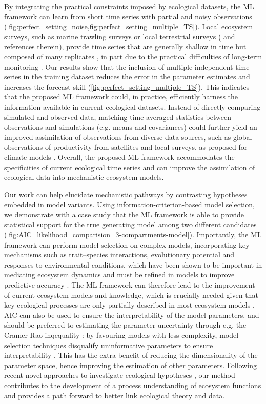 By integrating the practical constraints imposed by ecological datasets, the ML framework can learn from short time series with partial and noisy observations (\cref{fig:perfect_setting_noise,fig:perfect_setting_multiple_TS}). 
% 
Local ecosystem surveys, such as marine trawling surveys or local terrestrial surveys (\citep{Pinsky2013,Dornelas2018,Burrows2019} and references therein), provide time series that are generally shallow in time but composed of many replicates \citep{Hsieh2008,Clark2015}, in part due to the practical difficulties of long-term monitoring \citep{Ye2016}. 
% 
Our results show that the inclusion of multiple independent time series in the training dataset reduces the error in the parameter estimates and increases the forecast skill (\cref{fig:perfect_setting_multiple_TS}). This indicates that the proposed ML framework could, in practice, efficiently harness the information available in current ecological datasets.
% 
Instead of directly comparing simulated and observed data, matching time-averaged statistics between observations and simulations (e.g. means and covariances) could further yield an improved assimilation of observations from diverse data sources, such as global observations of productivity from satellites and local surveys, as proposed for climate models \citep{Schneider2017}.
% 
Overall, the proposed ML framework accommodates the specificities of current ecological time series and can improve the assimilation of ecological data into mechanistic ecosystem models.

Our work can help elucidate mechanistic pathways by contrasting hypotheses embedded in model variants.
%
Using information-criterion-based model selection, we demonstrate with a case study that the ML framework is able to provide statistical support for the true generating model among two different candidates (\cref{fig:AIC_likelihood_comparision_3-compartments-model}).
% 
Importantly, the ML framework can perform model selection on complex models, incorporating key mechanisms such as trait--species interactions, evolutionary potential and responses to environmental conditions, which have been shown to be important in mediating ecosystem dynamics and must be refined in models to improve predictive accuracy \citep{Urban2016}.
% 
The ML framework can therefore lead to the improvement of current ecosystem models and knowledge, which is crucially needed given that key ecological processes are only partially described in most ecosystem models \citep{Schartau2017}.
% 
AIC can also be used to ensure the interpretability of the model parameters, and should be preferred to estimating the parameter uncertainty through e.g. the Cramer Rao inqequality \citep{Burnham2002}: by favouring models with less complexity, model selection techniques disqualify uninformative parameters to ensure interpretability \citep{Burnham2002}. This has the extra benefit of reducing the dimensionality of the parameter space, hence improving the estimation of other parameters. 
%
Following recent novel approaches to investigate ecological hypotheses \citep{Curtsdotter2019}, our method contributes to the development of a process understanding of ecosystem functions and provides a path forward to better link ecological theory and data.


